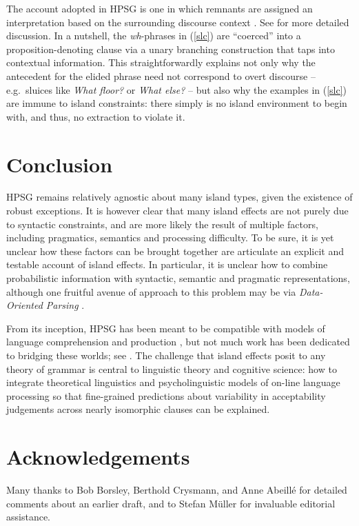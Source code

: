 \documentclass[output=paper
	        ,collection
	        ,collectionchapter
 	        ,biblatex
                ,babelshorthands
                ,newtxmath
                ,draftmode
                ,colorlinks, citecolor=brown
]{langscibook}
\begin{document}
The  account adopted in HPSG is one in which remnants  are assigned an interpretation based on the surrounding discourse context  \citep{ginzsag,Culicover:Jackendoff:05,jacobson08,sagn}. 
See  for more detailed discussion. In a nutshell,  the \emph{wh}-phrases in (\ref{slc}) are ``coerced'' into a proposition-denoting clause via a unary branching construction that taps into contextual information.  This straightforwardly explains not only why the antecedent for the elided phrase need not correspond to  overt discourse --  e.g.\ sluices like \emph{What floor?} or \emph{What else?} --
but also  why the examples in (\ref{slc})  are immune to island constraints: there simply is no island
 environment to begin with, and thus, no extraction to violate it.



\section{Conclusion}

HPSG remains relatively agnostic about many island types, given the existence of robust exceptions.
It is however clear that many island effects are not purely due to syntactic constraints, and are more likely
the result of multiple factors, including pragmatics, semantics and processing difficulty.
To be sure, it is yet unclear how these factors can be brought together are articulate an explicit
and testable account of island effects. In particular, it is unclear how to combine probabilistic information with syntactic, semantic and pragmatic representations, although one fruitful avenue of approach to this problem may be via  \emph{Data-Oriented Parsing} \citep{NF2002a-u,NF99a,Arnold:Linardaki:07,BSS2003a-ed,Bod2009a}.  


From its inception, HPSG has been meant to be compatible with models of language comprehension and production \citep{sagser,Sag:Wasow:ta,Sag:Wasow:ta2}, but not much work has been dedicated to bridging these worlds; see . The challenge that island effects posit to any theory of grammar is central to linguistic theory and cognitive science: how to integrate theoretical linguistics and psycholinguistic models of on-line language processing so that fine-grained predictions about variability in acceptability judgements across nearly isomorphic clauses can be explained.


 
\section*{Acknowledgements}

Many thanks to Bob Borsley, Berthold Crysmann, and Anne Abeillé for
detailed comments about an earlier draft, and to Stefan Müller for
invaluable editorial assistance.

{\sloppy
\printbibliography[heading=subbibliography,notkeyword=this] 
}
\end{document}
